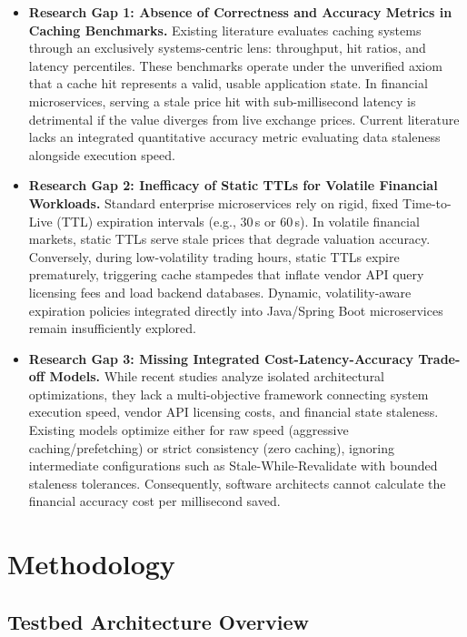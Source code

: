 \documentclass[11pt,a4paper]{article}
\begin{document}
\begin{itemize}[leftmargin=1.5em]
  \item \textbf{Research Gap 1: Absence of Correctness and Accuracy Metrics in Caching Benchmarks.}
  Existing literature evaluates caching systems through an exclusively systems-centric lens: throughput, hit ratios, and latency percentiles. These benchmarks operate under the unverified axiom that a cache hit represents a valid, usable application state. In financial microservices, serving a stale price hit with sub-millisecond latency is detrimental if the value diverges from live exchange prices. Current literature lacks an integrated quantitative accuracy metric evaluating data staleness alongside execution speed.

  \item \textbf{Research Gap 2: Inefficacy of Static TTLs for Volatile Financial Workloads.}
  Standard enterprise microservices rely on rigid, fixed Time-to-Live (TTL) expiration intervals (e.g., 30\,s or 60\,s). In volatile financial markets, static TTLs serve stale prices that degrade valuation accuracy. Conversely, during low-volatility trading hours, static TTLs expire prematurely, triggering cache stampedes that inflate vendor API query licensing fees and load backend databases. Dynamic, volatility-aware expiration policies integrated directly into Java/Spring Boot microservices remain insufficiently explored.

  \item \textbf{Research Gap 3: Missing Integrated Cost-Latency-Accuracy Trade-off Models.}
  While recent studies analyze isolated architectural optimizations, they lack a multi-objective framework connecting system execution speed, vendor API licensing costs, and financial state staleness. Existing models optimize either for raw speed (aggressive caching/prefetching) or strict consistency (zero caching), ignoring intermediate configurations such as Stale-While-Revalidate with bounded staleness tolerances. Consequently, software architects cannot calculate the financial accuracy cost per millisecond saved.
\end{itemize}

\section{Methodology}
\label{sec:method}

\subsection{Testbed Architecture Overview}
\end{document}
